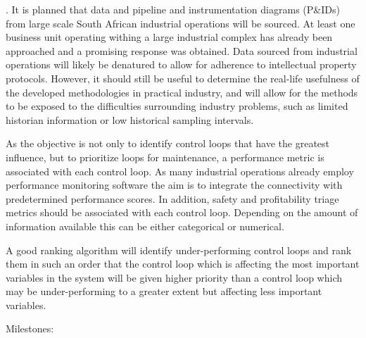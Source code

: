 \documentclass{article}
\begin{document}
.
It is planned that data and pipeline and instrumentation diagrams (P\&IDs) from large scale South African industrial operations will be sourced.
At least one business unit operating withing a large industrial complex has already been approached and a promising response was obtained.
Data sourced from industrial operations will likely be denatured to allow for adherence to intellectual property protocols.
However, it should still be useful to determine the real-life usefulness of the developed methodologies in practical industry, and will allow for the methods to be exposed to the difficulties surrounding industry problems, such as limited historian information or low historical sampling intervals.



As the objective is not only to identify control loops that have the greatest influence, but to prioritize loops for maintenance, a performance metric is associated with each control loop.
As many industrial operations already employ performance monitoring software the aim is to integrate the connectivity with predetermined performance scores.
In addition, safety and profitability triage metrics should be associated with each control loop.
Depending on the amount of information available this can be either categorical or numerical.

A good ranking algorithm will identify under-performing control loops and rank them in such an order that the control loop which is affecting the most important variables in the system will be given higher priority than a control loop which may be under-performing to a greater extent but affecting less important variables.


Milestones:









\end{document}
